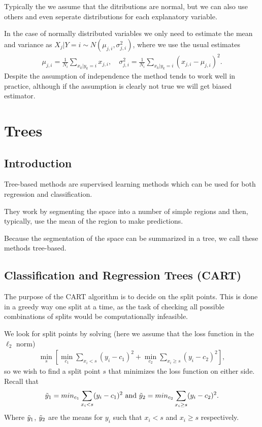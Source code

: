 \documentclass[aspectratio=169,10pt]{beamer}
\begin{document}
\begin{frame}{\secname}{\subsecname}
  Typically the we assume that the ditributions are normal, but we can also use others and even seperate distributions for each explanatory variable.

  In the case of normally distributed variables we only need to estimate the mean and variance as $X_j | Y = i \sim N(\mu_{j,i}, \sigma^2_{j,i})$, where we use the usual estimates
  \begin{align}
    \mu_{j,i} = \frac{1}{N_i} \sum_{x_k | y_k = i} x_{j,i}, \quad
    \sigma_{j,i}^2 = \frac{1}{N_i} \sum_{x_k | y_k = i}(x_{j,i} - \mu_{j,i})^2.
  \end{align}
  Despite the assumption of independence the method tends to work well in practice, although if the assumption is clearly not true we will get biased estimator.
\end{frame}

\section{Trees}

\subsection{Introduction}
\begin{frame}{\secname}{\subsecname}
  Tree-based methods are supervised learning methods which can be used for both regression and classification.
  
  They work by segmenting the space into a number of simple regions and then, typically, use the mean of the region to make predictions.
  
  Because the segmentation of the space can be summarized in a tree, we call these methods tree-based.
\end{frame}

\subsection{Classification and Regression Trees (CART)}
\begin{frame}{\secname}{\subsecname}
  The purpose of the CART algorithm is to decide on the split points. This is done in a greedy way one split at a time, as the task of checking all possible combinations of splits would be computationally infeasible.

  We look for split points by solving (here we assume that the loss function in the $\ell_2$ norm)
  {\small\begin{align*}
      \min_s \left[\min_{c_1} \sum_{x_i < s} \left(y_i - c_1\right)^2 + \min_{c_2} \sum_{x_i \geq s}\left(y_i - c_2\right)^2\right],  
  \end{align*}}
  so we wish to find a split point $s$ that minimizes the loss function on either side. 
  Recall that {\small $$\Tilde{y}_1 = min_{c_1} \sum_{x_i < s} (y_i - c_1)^2 \text{ and } \Tilde{y}_2 = min_{c_2} \sum_{x_i \geq s} (y_i - c_2)^2.$$} 
  Where $\Tilde{y}_1$, $\Tilde{y}_2$ are the means for $y_i$ such that $x_i < s$ and $x_i \geq s$ respectively.
\end{frame}
\end{document}
